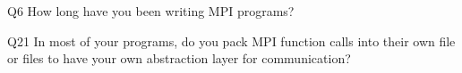 \begin{description}%
\item{Q6} How long have you been writing MPI programs?%
\item{Q21} In most of your programs, do you pack MPI function calls into their own file or files to have your own abstraction layer for communication?%
\end{description}%
